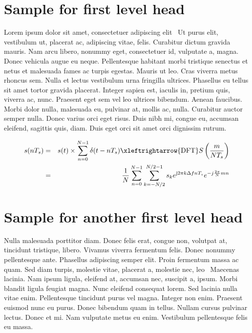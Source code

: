 \documentclass[AMS,STIX1COL]{WileyNJD-v2}
\begin{document}


\section{Sample for first level head}\label{sec1}

Lorem ipsum dolor sit amet, consectetuer adipiscing elit~\citet{Rothermel1997} Ut purus elit, vestibulum ut, placerat ac, adipiscing vitae,
felis. Curabitur dictum gravida mauris. Nam arcu libero, nonummy eget, consectetuer id, vulputate a, magna. Donec
vehicula augue eu neque. Pellentesque habitant morbi tristique senectus et netus et malesuada fames ac turpis egestas.
Mauris ut leo. Cras viverra metus rhoncus sem. Nulla et lectus vestibulum urna fringilla ultrices. Phasellus eu tellus
sit amet tortor gravida placerat. Integer sapien est, iaculis in, pretium quis, viverra ac, nunc. Praesent eget sem vel
leo ultrices bibendum. Aenean faucibus. Morbi dolor nulla, malesuada eu, pulvinar at, mollis ac, nulla. Curabitur
auctor semper nulla. Donec varius orci eget risus. Duis nibh mi, congue eu, accumsan eleifend, sagittis quis, diam.
Duis eget orci sit amet orci dignissim rutrum.

\begin{eqnarray}
s(nT_{s}) &= &s(t)\times \sum\limits_{n=0}^{N-1} \delta (t-nT_{s}) \xleftrightarrow{\mathrm{DFT}}  S \left(\frac{m}{NT_{s}}\right) \nonumber\\
&= &\frac{1}{N} \sum\limits_{n=0}^{N-1} \sum\limits_{k=-N/2}^{N/2-1} s_{k} e^{\mathrm{j}2\pi k\Delta fnT_{s}} e^{-j\frac{2\pi}{N}mn}
\end{eqnarray}

\section{Sample for another first level head}\label{sec2}

Nulla malesuada porttitor diam. Donec felis erat, congue non, volutpat at, tincidunt tristique, libero. Vivamus viverra
fermentum felis. Donec nonummy pellentesque ante. Phasellus adipiscing semper elit. Proin fermentum massa ac
quam. Sed diam turpis, molestie vitae, placerat a, molestie nec, leo~\cite{Rothermel1998} Maecenas lacinia. Nam ipsum ligula, eleifend
at, accumsan nec, suscipit a, ipsum. Morbi blandit ligula feugiat magna. Nunc eleifend consequat lorem. Sed lacinia
nulla vitae enim. Pellentesque tincidunt purus vel magna. Integer non enim. Praesent euismod nunc eu purus. Donec
bibendum quam in tellus. Nullam cursus pulvinar lectus. Donec et mi. Nam vulputate metus eu enim. Vestibulum
pellentesque felis eu massa.
\end{document}
